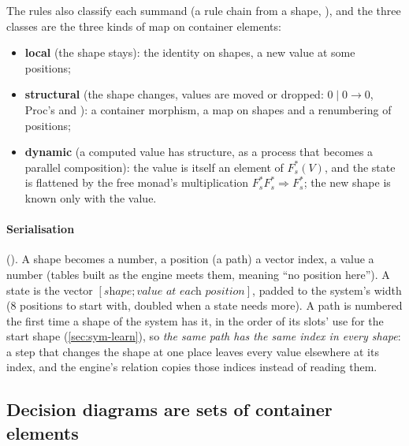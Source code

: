 The rules also classify each summand (a rule chain from a shape,
), and the three classes are the three kinds of map
on container elements:
\begin{itemize}
\item \textbf{local} (the shape stays): the identity on shapes, a new
  value at some positions;
\item \textbf{structural} (the shape changes, values are moved or
  dropped: $0 \mid 0 \to 0$, Proc's  and ):
  a container morphism, a map on shapes and a renumbering of positions;
\item \textbf{dynamic} (a computed value has structure, as a process that
  becomes a parallel composition): the value is itself an element of
  $F_s^{*}(V)$, and the state is flattened by the free monad's
  multiplication $F_s^{*}F_s^{*} \Rightarrow F_s^{*}$; the new shape is
  known only with the value.
\end{itemize}

\paragraph{Serialisation} (). A shape becomes a
number, a position (a path) a vector index, a value a number (tables
built as the engine meets them,  meaning ``no position here''). A
state is the vector $[\textit{shape}; \textit{value at each position}]$,
padded to the system's width (8 positions to start with, doubled when a
state needs more). A path is numbered the first time a shape of the
system has it, in the order of its slots' use for the start shape
(\cref{sec:sym-learn}), so \emph{the same path has the same index in every
shape}: a step that changes the shape at one place leaves every value
elsewhere at its index, and the engine's relation copies those indices
instead of reading them.

\subsection{Decision diagrams are sets of container elements}

